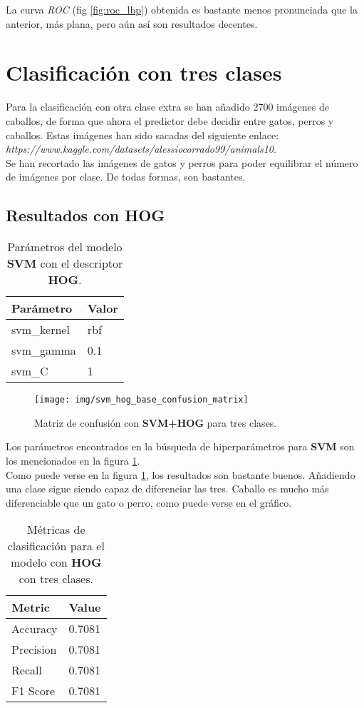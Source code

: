 \documentclass[12pt,letterpaper]{article}
\begin{document}
La curva \textit{ROC} (fig \ref{fig:roc_lbp}) obtenida es bastante menos pronunciada que la anterior, más plana, pero aún así son resultados decentes.

\section{Clasificación con tres clases}
Para la clasificación con otra clase extra se han añadido 2700 imágenes de caballos, de forma que ahora el predictor debe decidir entre gatos, perros y caballos. Estas imágenes han sido sacadas del siguiente enlace: \textit{https://www.kaggle.com/datasets/alessiocorrado99/animals10}.\\[6pt]
Se han recortado las imágenes de gatos y perros para poder equilibrar el número de imágenes por clase. De todas formas, son bastantes.
\subsection{Resultados con HOG}
\begin{table}[htp]
    \centering
    \begin{tabular}{ll}
    \hline
    \textbf{Parámetro} & \textbf{Valor} \\
    \hline
    svm\_kernel & rbf \\
    svm\_gamma & 0.1 \\
    svm\_C & 1 \\
    \hline
    \end{tabular}
    \caption{Parámetros del modelo \textbf{SVM} con el descriptor \textbf{HOG}.}
    \label{tab:svm_params3}
\end{table}

\begin{figure}[htp]
    \centering
    \texttt{[image: img/svm\_hog\_base\_confusion\_matrix]}
    \caption{Matriz de confusión con \textbf{SVM+HOG} para tres clases.}
    \label{fig:confusion_matrix}
\end{figure}

Los parámetros encontrados en la búsqueda de hiperparámetros para \textbf{SVM} son los mencionados en la figura \ref{tab:svm_params3}.\\[6pt]
Como puede verse en la figura \ref{fig:confusion_matrix}, los resultados son bastante buenos. Añadiendo una clase sigue siendo capaz de diferenciar las tres. Caballo es mucho más diferenciable que un gato o perro, como puede verse en el gráfico.

\begin{table}[htp]
    \centering
    \begin{tabular}{ll}
    \hline
    \textbf{Metric} & \textbf{Value} \\
    \hline
    Accuracy    & 0.7081 \\
    Precision   & 0.7081 \\
    Recall      & 0.7081 \\
    F1 Score    & 0.7081 \\
    \hline
    \end{tabular}
    \caption{Métricas de clasificación para el modelo con \textbf{HOG} con tres clases.}
    \label{tab:classification_metrics_hog_3}
\end{table}
\end{document}
